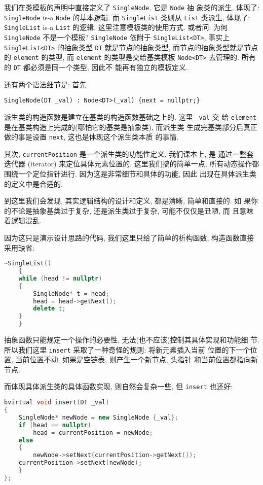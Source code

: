 \documentclass[a4paper]{ctexart}
\theoremstyle{definition}
\theoremstyle{definition}
\begin{document}
我们在类模板的声明中直接定义了 \verb|SingleNode|, 它是 \verb|Node| 抽
象类的派生, 体现了: \verb|SingleNode| is-a \verb|Node| 的基本逻辑. 而
\verb|SingleList| 类则从 \verb|List| 类派生, 体现了: \verb|SingleList|
is-a \verb|List| 的逻辑. 这里注意模板类的使用方式. 或者问: 为何
\verb|SingleNode| 不是一个模板? \verb|SingleNode| 依附于
\verb|SingleList<DT>|, 事实上 \verb|SingleList<DT>| 的抽象类型
\verb|DT| 就是节点的抽象类型, 而节点的抽象类型就是节点的
\verb|element| 的类型, 而 \verb|element| 的类型是交给基类模板
\verb|Node<DT>| 去管理的. 所有的 \verb|DT| 都必须是同一个类型, 因此不
能再有独立的模板定义. 

还有两个语法细节是: 首先
\begin{verbatim}
SingleNode(DT _val) : Node<DT>(_val) {next = nullptr;}
\end{verbatim}

派生类的构造函数是建立在基类的构造函数基础之上的. 这里 \verb|_val| 交
给 \verb|element| 是在基类构造上完成的(哪怕它的基类是抽象类), 而派生类
生成完基类部分后真正做的事是设置 \verb|next|, 这也是体现这个派生类本质
的事情.

其次, \verb|currentPosition| 是一个派生类的功能性定义. 我们课本上, 是
通过一整套迭代器 (iterator) 来定位具体元素位置的, 这里我们搞的简单一点,
所有动态操作都围绕一个定位指针进行. 因为这是非常细节和具体的功能, 因此
出现在具体派生类的定义中是合适的. 

到这里我们会发现, 其实逻辑结构的设计和定义, 都是清晰, 简单和直接的. 如
果你的不论是抽象基类过于复杂, 还是派生类过于复杂, 可能不仅仅是丑陋, 而
且意味着逻辑混乱.

因为这只是演示设计思路的代码, 我们这里只给了简单的析构函数, 构造函数直接采用缺省:
\begin{lstlisting}[language=C++]
    ~SingleList()
    {
	while (head != nullptr)
	{
	    SingleNode* t = head;
	    head = head->getNext();
	    delete t;
	}
    }
\end{lstlisting}

抽象函数只能规定一个操作的必要性, 无法(也不应该)控制其具体实现和功能细
节. 所以我们这里 \verb|insert| 采取了一种奇怪的规则: 将新元素插入当前
位置的下一个位置, 当前位置不动. 如果是空链表, 则产生一个新节点, 头指针
和当前位置都指向新节点. 

而体现具体派生类的具体函数实现, 则自然会复杂一些, 但 \verb|insert| 也还好:

\begin{lstlisting}[language=C++]
bvirtual void insert(DT _val)
{
    SingleNode* newNode = new SingleNode {_val};
    if (head == nullptr)
        head = currentPosition = newNode;
    else
    {
        newNode->setNext(currentPosition->getNext());
	currentPosition->setNext(newNode);
    }
};
\end{lstlisting}
\end{document}
